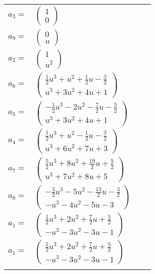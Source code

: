 \documentclass[1p]{elsarticle_modified}
\theoremstyle{definition}
\begin{document}
\begin{tabular}{m{7pt} m{180pt} m{7pt} m{180pt} }
\flushright $a_{3}=$&$\begin{pmatrix}1\\0\end{pmatrix}$ \\
\flushright $a_{9}=$&$\begin{pmatrix}0\\u\end{pmatrix}$ \\
\flushright $a_{2}=$&$\begin{pmatrix}1\\u^2\end{pmatrix}$ \\
\flushright $a_{6}=$&$\begin{pmatrix}\frac{1}{2} u^3+u^2+\frac{1}{2} u-\frac{3}{2}\\u^3+3 u^2+4 u+1\end{pmatrix}$ \\
\flushright $a_{5}=$&$\begin{pmatrix}-\frac{1}{2} u^3-2 u^2-\frac{7}{2} u-\frac{5}{2}\\u^3+3 u^2+4 u+1\end{pmatrix}$ \\
\flushright $a_{4}=$&$\begin{pmatrix}\frac{1}{2} u^3+u^2-\frac{1}{2} u-\frac{3}{2}\\u^3+6 u^2+7 u+3\end{pmatrix}$ \\
\flushright $a_{7}=$&$\begin{pmatrix}\frac{5}{2} u^3+8 u^2+\frac{19}{2} u+\frac{5}{2}\\u^3+7 u^2+8 u+5\end{pmatrix}$ \\
\flushright $a_{8}=$&$\begin{pmatrix}-\frac{3}{2} u^3-5 u^2-\frac{13}{2} u-\frac{3}{2}\\- u^3-4 u^2-5 u-3\end{pmatrix}$ \\
\flushright $a_{1}=$&$\begin{pmatrix}\frac{1}{2} u^3+2 u^2+\frac{7}{2} u+\frac{5}{2}\\- u^3-3 u^2-3 u-1\end{pmatrix}$\\ \flushright $a_{1}=$&$\begin{pmatrix}\frac{1}{2} u^3+2 u^2+\frac{7}{2} u+\frac{5}{2}\\- u^3-3 u^2-3 u-1\end{pmatrix}$\\&\end{tabular}
\end{document}
